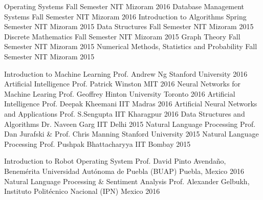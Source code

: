 \begin{cvhonors}
  \cvhonor
    {Operating Systems}
    {Fall Semester}
    {NIT Mizoram}
    {2016}
  \cvhonor
    {Database Management Systems}
    {Fall Semester}
    {NIT Mizoram}
    {2016}
  \cvhonor
    {Introduction to Algorithms}
    {Spring Semester}
    {NIT Mizoram}
    {2015}
  \cvhonor
    {Data Structures}
    {Fall Semester}
    {NIT Mizoram}
    {2015}
  \cvhonor
    {Discrete Mathematics}
    {Fall Semester }
    {NIT Mizoram}
    {2015}
  \cvhonor
    {Graph Theory}
    {Fall Semester}
    {NIT Mizoram}
    {2015}
  \cvhonor
    {Numerical Methods, Statistics and Probability}
    {Fall Semester}
    {NIT Mizoram}
    {2015}
\end{cvhonors}
\begin{cvhonors}
  \cvhonor
    {Introduction to Machine Learning}
    {Prof. Andrew Ng}
    {Stanford University}
    {2016}
  \cvhonor
    {Artificial Intelligence}
    {Prof. Patrick Winston}
    {MIT}
    {2016}
  \cvhonor
    {Neural Networks for Machine Learing}
    {Prof. Geoffrey Hinton}
    {University Toronto}
    {2016}
  \cvhonor
    {Artificial Intelligence}
    {Prof. Deepak Kheemani}
    {IIT Madras}
    {2016}
  \cvhonor
    {Artificial Neural Networks and Applications}
    {Prof. S.Sengupta}
    {IIT Kharagpur}
    {2016}
\cvhonor
    {Data Structures and Algorithms}
    {Dr. Naveen Garg}
    {IIT Delhi}
    {2015}
\cvhonor
    {Natural Language Processing}
    {Prof. Dan Jurafski \& Prof. Chris Manning}
    {Stanford University}
    {2015}
  \cvhonor
    {Natural Language Processing}
    {Prof. Pushpak Bhattacharyya}
    {IIT Bombay}
    {2015}
\end{cvhonors}

\begin{cvhonors}
  \cvhonor
    {Introduction to Robot Operating System}
    {Prof. David Pinto Avendaño, Benemérita Universidad Autónoma de Puebla (BUAP)}
    {Puebla, Mexico}
    {2016}
  \cvhonor
    {Natural Language Processing \& Sentiment Analysis}
    {Prof. Alexander Gelbukh, Instituto Politécnico Nacional (IPN)}
    {Mexico}
    {2016}
\end{cvhonors}

